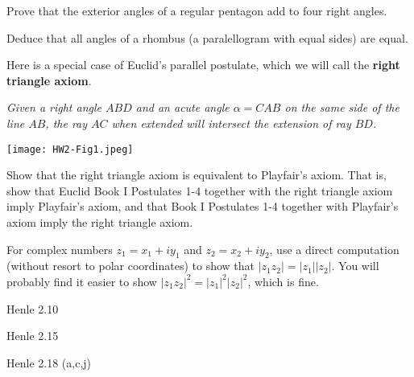 \documentclass[minion]{homework}
\begin{document}
\begin{problems}

\problem Prove that the exterior angles of a regular pentagon add to four right angles.

\problem Deduce that all angles of a rhombus (a paralellogram with equal sides) are equal.

\problem Here is a special case of Euclid's parallel postulate, which we will call the
\textbf{right triangle axiom}.

\textit{Given a right angle $ABD$ and an acute angle $\alpha = CAB$ on the same side of the line $AB$,
the ray $AC$ when extended will intersect the extension of ray $BD$.}


\hfil\texttt{[image: HW2-Fig1.jpeg]}

Show that the right triangle axiom is equivalent to Playfair's axiom. That is, show that Euclid Book I Postulates 1-4 together with the right triangle axiom imply Playfair's axiom, and that 
Book I Postulates 1-4 together with Playfair's axiom imply the right triangle axiom.

\problem For complex numbers $z_1=x_1+iy_1$ and $z_2=x_2+iy_2$, use a direct computation (without resort to polar coordinates) to show that $|z_1z_2|=|z_1||z_2|$.
You will probably find it easier to show
$|z_1z_2|^2=|z_1|^2|z_2|^2$, which is fine.

\problem Henle 2.10

\problem Henle 2.15

\problem Henle 2.18 (a,c,j)

\end{problems}
\end{document}
